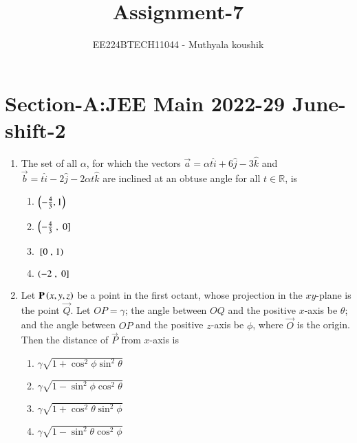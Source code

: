 \documentclass[journal,12pt,onecolumn]{IEEEtran}
\theoremstyle{remark}
\begin{document}

\vspace{3cm}

\title{Assignment-7}
\author{EE224BTECH11044 - Muthyala koushik
}
\maketitle
\bigskip

\renewcommand{\thefigure}{\theenumi}
\renewcommand{\thetable}{\theenumi}

\section{Section-A:JEE Main 2022-29 June-shift-2}
\begin{enumerate}[start=1]
	\item The set of all $\alpha$, for which the vectors $\vec{a}=\alpha t\hat{i}+6\hat{j}-3\hat{k}$ and $\vec{b}=t\hat{i}-2\hat{j}-2\alpha t\hat{k}$ are inclined at an obtuse angle for all $t\in\mathbb{R}$, is
		\begin{enumerate}
			\item $\left(-\frac{4}{3},1\right)$\\
			\item $\left(-\frac{4}{3}\right.,{}\left.0\right]$\\
			\item ${}\left[0\right.,\left.1\right)$\\
			\item $\left(-2\right.,{}\left.0\right]$\\
		\end{enumerate}
	\item Let $\mathbf{P}\left(x,y,z\right)$ be a point in the first octant, whose projection in the $xy$-plane is the point $\vec{Q}$. Let $OP=\gamma$; the angle between $OQ$ and the positive $x$-axis be $\theta$; and the angle between $OP$ and the positive $z$-axis be $\phi$, where $\vec{O}$ is the origin. Then the distance of $\vec{P}$ from $x$-axis is 
		\begin{enumerate}
			\item $\gamma\sqrt{1+\cos^2{\phi}\sin^2{\theta}}$\\
			\item $\gamma\sqrt{1-\sin^2{\phi}\cos^2{\theta}}$\\
			\item $\gamma\sqrt{1+\cos^2{\theta}\sin^2{\phi}}$\\
			\item $\gamma\sqrt{1-\sin^2{\theta}\cos^2{\phi}}$\\

\end{enumerate}
\end{enumerate}
\end{document}
